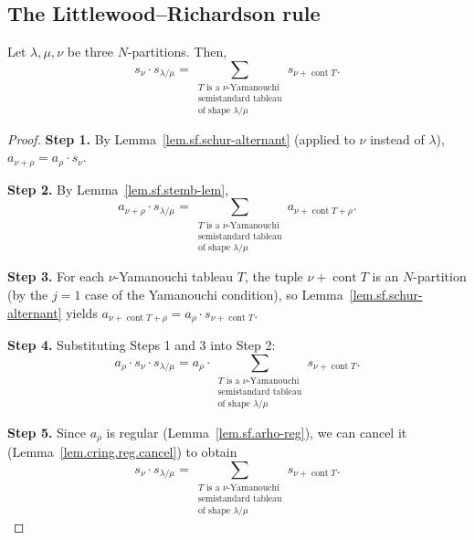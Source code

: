 \subsection{The Littlewood--Richardson rule}

\begin{theorem}
\label{thm.sf.lr-zy}
\leantarget
\leanok
Let $\lambda,\mu,\nu$ be three $N$-partitions. Then,%
\begin{equation}
s_{\nu}\cdot s_{\lambda/\mu}=\sum_{\substack{T\text{ is a }\nu
\text{-Yamanouchi}\\\text{semistandard tableau}\\\text{of shape }\lambda/\mu
}}s_{\nu+\operatorname*{cont}T}. \label{eq.thm.sf.lr-zy.eq}%
\end{equation}
\end{theorem}

\begin{proof}
\leanok
\textbf{Step 1.} By Lemma~\ref{lem.sf.schur-alternant} (applied to $\nu$
instead of $\lambda$), $a_{\nu+\rho} = a_{\rho} \cdot s_{\nu}$.

\textbf{Step 2.} By Lemma~\ref{lem.sf.stemb-lem},
\[
a_{\nu+\rho} \cdot s_{\lambda/\mu}
= \sum_{\substack{T \text{ is a } \nu\text{-Yamanouchi} \\
    \text{semistandard tableau} \\ \text{of shape } \lambda/\mu}}
  a_{\nu + \operatorname{cont} T + \rho}.
\]

\textbf{Step 3.} For each $\nu$-Yamanouchi tableau $T$, the tuple
$\nu + \operatorname{cont} T$ is an $N$-partition (by the $j=1$ case of the
Yamanouchi condition), so Lemma~\ref{lem.sf.schur-alternant} yields
$a_{\nu + \operatorname{cont} T + \rho} = a_{\rho} \cdot s_{\nu + \operatorname{cont} T}$.

\textbf{Step 4.} Substituting Steps 1 and 3 into Step 2:
\[
a_{\rho} \cdot s_{\nu} \cdot s_{\lambda/\mu}
= a_{\rho} \cdot \sum_{\substack{T \text{ is a } \nu\text{-Yamanouchi} \\
    \text{semistandard tableau} \\ \text{of shape } \lambda/\mu}}
  s_{\nu + \operatorname{cont} T}.
\]

\textbf{Step 5.} Since $a_{\rho}$ is regular (Lemma~\ref{lem.sf.arho-reg}),
we can cancel it (Lemma~\ref{lem.cring.reg.cancel}) to obtain
\[
s_{\nu} \cdot s_{\lambda/\mu}
= \sum_{\substack{T \text{ is a } \nu\text{-Yamanouchi} \\
    \text{semistandard tableau} \\ \text{of shape } \lambda/\mu}}
  s_{\nu + \operatorname{cont} T}.
\]
\end{proof}
